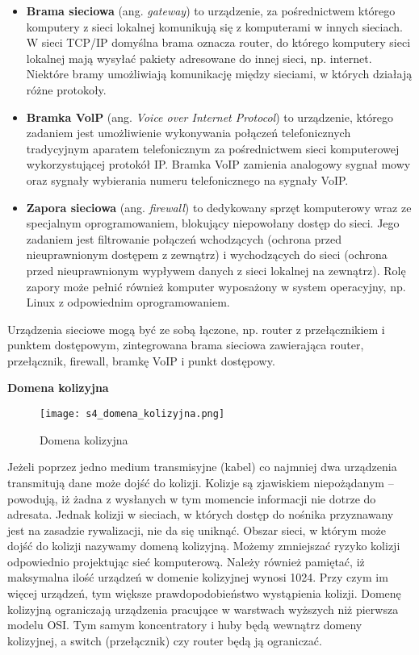 \begin{itemize}
	\item \textbf{Brama sieciowa} (ang. \textit{gateway}) to urządzenie, za pośrednictwem którego komputery z sieci lokalnej komunikują się z komputerami w innych sieciach. W sieci TCP/IP domyślna brama oznacza router, do którego komputery sieci lokalnej mają wysyłać pakiety adresowane do innej sieci, np. internet. Niektóre bramy umożliwiają komunikację między sieciami, w których działają różne protokoły.

	\item \textbf{Bramka VolP} (ang. \textit{Voice over Internet Protocol}) to urządzenie, którego zadaniem jest umożliwienie wykonywania połączeń telefonicznych tradycyjnym aparatem telefonicznym za pośrednictwem sieci komputerowej wykorzystującej protokół IP. Bramka VoIP zamienia analogowy sygnał mowy oraz sygnały wybierania numeru telefonicznego na sygnały VoIP.

	\item \textbf{Zapora sieciowa} (ang. \textit{firewall}) to dedykowany sprzęt komputerowy wraz ze specjalnym oprogramowaniem, blokujący niepowołany dostęp do sieci. Jego zadaniem jest filtrowanie połączeń wchodzących (ochrona przed nieuprawnionym dostępem z zewnątrz) i wychodzących do sieci (ochrona przed nieuprawnionym wypływem danych z sieci lokalnej na zewnątrz). Rolę zapory może pełnić również komputer wyposażony w system operacyjny, np. Linux z odpowiednim oprogramowaniem.
\end{itemize}

Urządzenia sieciowe mogą być ze sobą łączone, np. router z przełącznikiem i punk­tem dostępowym, zintegrowana brama sieciowa zawierająca router, przełącznik, firewall, bramkę VoIP i punkt dostępowy.

\textbf{Domena kolizyjna}

\begin{figure}[H]
	\centering
	\texttt{[image: s4\_domena\_kolizyjna.png]}
	\caption{Domena kolizyjna}
\end{figure}

Jeżeli poprzez jedno medium transmisyjne (kabel) co najmniej dwa urządzenia transmitują dane może dojść do kolizji. Kolizje są zjawiskiem niepożądanym – powodują, iż żadna z wysłanych w tym momencie informacji nie dotrze do adresata. Jednak kolizji w sieciach, w których dostęp do nośnika przyznawany jest na zasadzie rywalizacji, nie da się uniknąć. Obszar sieci, w którym może dojść do kolizji nazywamy domeną kolizyjną. Możemy zmniejszać ryzyko kolizji odpowiednio projektując sieć komputerową. Należy również pamiętać, iż maksymalna ilość urządzeń w domenie kolizyjnej wynosi 1024. Przy czym im więcej urządzeń, tym większe prawdopodobieństwo wystąpienia kolizji. Domenę kolizyjną ograniczają urządzenia pracujące w warstwach wyższych niż pierwsza modelu OSI. Tym samym koncentratory i huby będą wewnątrz domeny kolizyjnej, a switch (przełącznik) czy router będą ją ograniczać.

